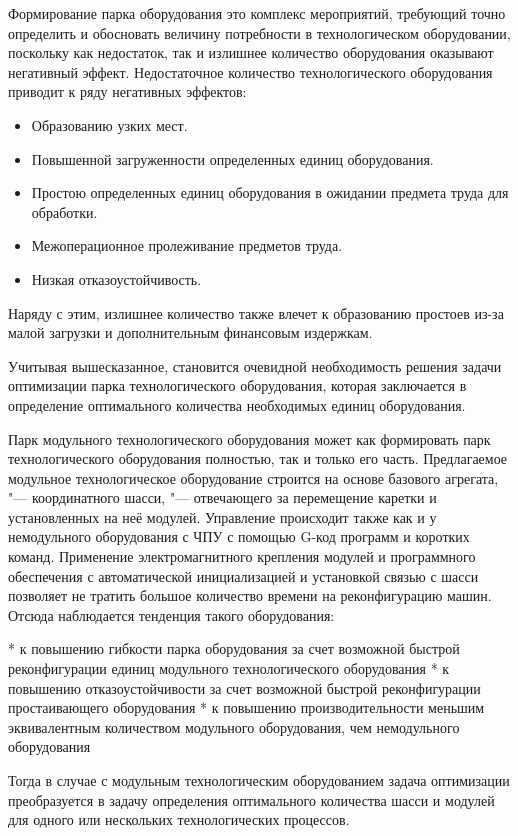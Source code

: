 {Формирование парка оборудования это комплекс мероприятий, требующий точно определить и обосновать величину потребности в технологическом оборудовании, поскольку как недостаток, так и излишнее количество оборудования оказывают негативный эффект. Недостаточное количество технологического оборудования  приводит к ряду негативных эффектов:

\begin{itemize}
	\item Образованию узких мест.
	\item Повышенной загруженности определенных единиц оборудования.
	\item Простою определенных единиц оборудования в ожидании предмета труда для обработки.
	\item Межоперационное пролеживание предметов труда.
	\item Низкая отказоустойчивость.
\end{itemize}


Наряду с этим, излишнее количество также влечет к образованию простоев из-за малой загрузки и дополнительным финансовым издержкам. 

Учитывая вышесказанное, становится очевидной необходимость решения задачи оптимизации парка технологического оборудования, которая заключается в  определение оптимального количества необходимых единиц оборудования.

Парк модульного технологического оборудования может как формировать парк технологического оборудования полностью, так и только его часть. Предлагаемое модульное технологическое оборудование строится на основе базового агрегата, "--- координатного шасси, "--- отвечающего за перемещение каретки и установленных на неё модулей. Управление происходит также как и у немодульного оборудования с ЧПУ с помощью G-код программ и коротких команд. Применение электромагнитного крепления модулей и программного обеспечения с автоматической инициализацией и установкой связью с шасси позволяет не тратить большое количество времени на реконфигурацию машин. Отсюда наблюдается тенденция такого оборудования:

* к повышению гибкости парка оборудования за счет возможной быстрой реконфигурации единиц модульного технологического оборудования
* к повышению отказоустойчивости за счет возможной быстрой реконфигурации простаивающего оборудования
* к повышению производительности меньшим эквивалентным количеством модульного оборудования, чем немодульного оборудования

Тогда в случае с модульным технологическим оборудованием задача оптимизации преобразуется в задачу определения оптимального количества шасси и модулей для одного или нескольких технологических процессов.

}

